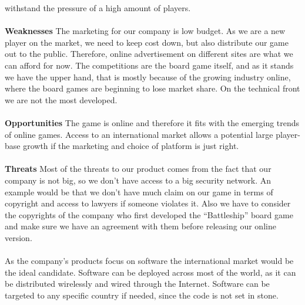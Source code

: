 withstand the pressure of a high amount of players.
	\\
	\\
	\textbf{Weaknesses}
	The marketing for our company is low budget. As we are a new player
  on the market, we need to keep cost down, but also distribute our game
   out to the public. Therefore, online advertisement on different sites
    are what we can afford for now. The competitions are the board game
     itself, and as it stands we have the upper hand, that is mostly because
     of the growing industry online, where the board games are beginning to
     lose market share. On the technical front we are not the most developed.
	\\
	\\
	\textbf{Opportunities}
	The game is online and therefore it fits with the emerging trends of online
   games. Access to an international market allows a potential large
    player-base growth if the marketing and choice of platform is just right.
	\\
	\\
	\textbf{Threats}
	Most of the threats to our product comes from the fact that our company
   is not big, so we don’t have access to a big security network. An example
   would be that we don’t have much claim on our game in terms of copyright
   and access to lawyers if someone violates it.  Also we have to consider
    the copyrights of the company who first developed the “Battleship” board
     game and make sure we have an agreement with them before releasing our
     online version.
	\\
	\\
	As the company’s products focus on software the international market would
   be the ideal candidate. Software can be deployed across most of the world,
    as it can be distributed wirelessly and wired through the Internet.
    Software can be targeted to any specific country if needed, since the
    code is not set in stone.
	\\
